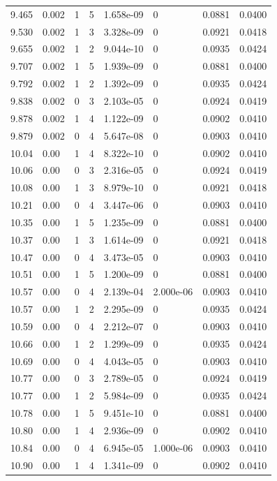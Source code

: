 \documentclass[preview]{standalone}
\begin{document}
{{{\begin{tabular}{L{1.2cm}C{1.2cm} C{0.3cm}C{0.5cm} C{1.4cm}C{1.4cm} C{1.4cm}C{1.4cm}}
  9.465  &  0.002  & 1     &  5 &  1.658e-09  & 0  & 0.0881 &  0.0400   \\ 
  9.530  &  0.002  & 1     &  3 &  3.328e-09  & 0  & 0.0921 &  0.0418   \\ 
  9.655  &  0.002  & 1     &  2 &  9.044e-10  & 0  & 0.0935 &  0.0424   \\ 
  9.707  &  0.002  & 1     &  5 &  1.939e-09  & 0  & 0.0881 &  0.0400   \\ 
  9.792  &  0.002  & 1     &  2 &  1.392e-09  & 0  & 0.0935 &  0.0424   \\ 
  9.838  &  0.002  & 0     &  3 &  2.103e-05  & 0  & 0.0924 &  0.0419   \\ 
  9.878  &  0.002  & 1     &  4 &  1.122e-09  & 0  & 0.0902 &  0.0410   \\ 
  9.879  &  0.002  & 0     &  4 &  5.647e-08  & 0  & 0.0903 &  0.0410   \\ 
  10.04  &  0.00  & 1     &  4 &  8.322e-10  & 0  & 0.0902 &  0.0410   \\ 
  10.06  &  0.00  & 0     &  3 &  2.316e-05  & 0  & 0.0924 &  0.0419   \\ 
  10.08  &  0.00  & 1     &  3 &  8.979e-10  & 0  & 0.0921 &  0.0418   \\ 
  10.21  &  0.00  & 0     &  4 &  3.447e-06  & 0  & 0.0903 &  0.0410   \\ 
  10.35  &  0.00  & 1     &  5 &  1.235e-09  & 0  & 0.0881 &  0.0400   \\ 
  10.37  &  0.00  & 1     &  3 &  1.614e-09  & 0  & 0.0921 &  0.0418   \\ 
  10.47  &  0.00  & 0     &  4 &  3.473e-05  & 0  & 0.0903 &  0.0410   \\ 
  10.51  &  0.00  & 1     &  5 &  1.200e-09  & 0  & 0.0881 &  0.0400   \\ 
  10.57  &  0.00  & 0     &  4 &  2.139e-04  & 2.000e-06  & 0.0903 &  0.0410   \\ 
  10.57  &  0.00  & 1     &  2 &  2.295e-09  & 0  & 0.0935 &  0.0424   \\ 
  10.59  &  0.00  & 0     &  4 &  2.212e-07  & 0  & 0.0903 &  0.0410   \\ 
  10.66  &  0.00  & 1     &  2 &  1.299e-09  & 0  & 0.0935 &  0.0424   \\ 
  10.69  &  0.00  & 0     &  4 &  4.043e-05  & 0  & 0.0903 &  0.0410   \\ 
  10.77  &  0.00  & 0     &  3 &  2.789e-05  & 0  & 0.0924 &  0.0419   \\ 
  10.77  &  0.00  & 1     &  2 &  5.984e-09  & 0  & 0.0935 &  0.0424   \\ 
  10.78  &  0.00  & 1     &  5 &  9.451e-10  & 0  & 0.0881 &  0.0400   \\ 
  10.80  &  0.00  & 1     &  4 &  2.936e-09  & 0  & 0.0902 &  0.0410   \\ 
  10.84  &  0.00  & 0     &  4 &  6.945e-05  & 1.000e-06  & 0.0903 &  0.0410   \\ 
  10.90  &  0.00  & 1     &  4 &  1.341e-09  & 0  & 0.0902 &  0.0410   \\ 
\hline 
\end{tabular} 

}}}
\end{document}
